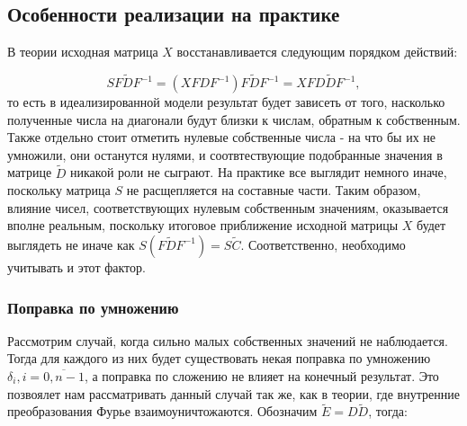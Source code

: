 \documentclass[a4paper]{article}
\theoremstyle{definition}
\begin{document}
    \subsection{Особенности реализации на практике}


    В теории исходная матрица $X$ восстанавливается следующим порядком действий:

    $$S  F\tilde{D}F^{-1} = (X FDF^{-1}) F\tilde{D}F^{-1} = X FD\tilde{D}F^{-1},$$ то есть в идеализированной модели результат будет зависеть от того, насколько полученные числа на диагонали будут близки к числам, обратным к собственным. Также отдельно стоит отметить нулевые собственные числа - на что бы их не умножили, они останутся нулями, и соотвтествующие подобранные значения в матрице $\tilde{D}$ никакой роли не сыграют. На практике все выглядит немного иначе, поскольку матрица $S$ не расщепляется на составные части. Таким образом, влияние чисел, соответствующих нулевым собственным значениям, оказывается вполне реальным, поскольку итоговое приближение исходной матрицы $X$ будет выглядеть не иначе как $S (F\tilde{D}F^{-1}) = S\tilde{C}$. Соответственно, необходимо учитывать и этот фактор.


    \subsubsection{Поправка по умножению}


    Рассмотрим случай, когда сильно малых собственных значений не наблюдается. Тогда для каждого из них будет существовать некая поправка по умножению $\delta_i, i = \overline{0, n-1}$, а поправка по сложению не влияет на конечный результат. Это позвоялет нам рассматривать данный случай так же, как в теории, где внутренние преобразования Фурье взаимоуничтожаются. Обозначим $\tilde{E} = D\tilde{D}$, тогда:
\end{document}
